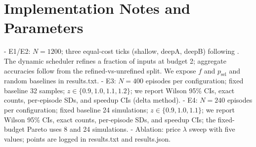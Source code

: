 \section{Implementation Notes and Parameters}
\label{app:impl}
- E1/E2: $N{=}1200$; three equal-cost ticks (shallow, deepA, deepB) following \cite{Huang2018MSDNet,Wang2018SkipNet}. The dynamic scheduler refines a fraction of inputs at budget 2; aggregate accuracies follow from the refined-vs-unrefined split. We expose $f$ and $p_{\mathrm{sel}}$ and random baselines in results.txt.
- E3: $N{=}400$ episodes per configuration; fixed baseline 32 samples; $z \in \{0.9,1.0,1.1,1.2\}$; we report Wilson 95\% CIs, exact counts, per-episode SDs, and speedup CIs (delta method).
- E4: $N{=}240$ episodes per configuration; fixed baseline 24 simulations; $z \in \{0.9,1.0,1.1\}$; we report Wilson 95\% CIs, exact counts, per-episode SDs, and speedup CIs; the fixed-budget Pareto uses 8 and 24 simulations.
- Ablation: price $\lambda$ sweep with five values; points are logged in results.txt and results.json.

